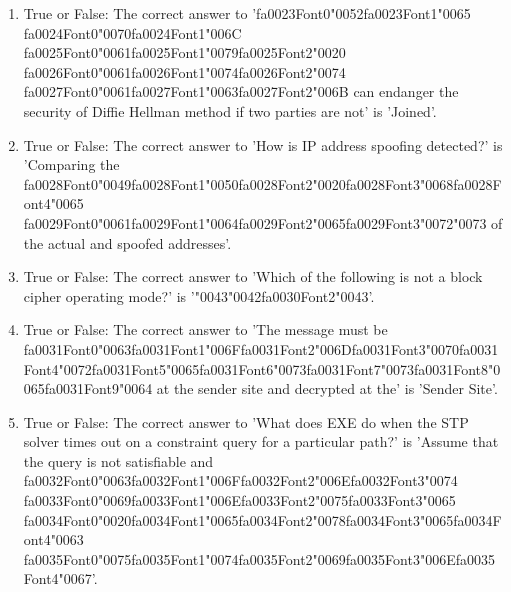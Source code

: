 \documentclass[12pt]{article}
\begin{document}
\begin{enumerate}[label=\arabic*.]
\item True or False: The correct answer to '{\csname fa0023Font0\endcsname\char"0052}{\csname fa0023Font1\endcsname\char"0065} {\csname fa0024Font0\endcsname\char"0070}{\csname fa0024Font1\endcsname\char"006C} {\csname fa0025Font0\endcsname\char"0061}{\csname fa0025Font1\endcsname\char"0079}{\csname fa0025Font2\endcsname\char"0020} {\csname fa0026Font0\endcsname\char"0061}{\csname fa0026Font1\endcsname\char"0074}{\csname fa0026Font2\endcsname\char"0074} {\csname fa0027Font0\endcsname\char"0061}{\csname fa0027Font1\endcsname\char"0063}{\csname fa0027Font2\endcsname\char"006B} can endanger the security of Diffie Hellman method if two parties are not' is 'Joined'.
\item True or False: The correct answer to 'How is IP address spoofing detected?' is 'Comparing the {\csname fa0028Font0\endcsname\char"0049}{\csname fa0028Font1\endcsname\char"0050}{\csname fa0028Font2\endcsname\char"0020}{\csname fa0028Font3\endcsname\char"0068}{\csname fa0028Font4\endcsname\char"0065} {\csname fa0029Font0\endcsname\char"0061}{\csname fa0029Font1\endcsname\char"0064}{\csname fa0029Font2\endcsname\char"0065}{\csname fa0029Font3\endcsname\char"0072}{\char"0073} of the actual and spoofed addresses'.
\item True or False: The correct answer to 'Which of the following is not a block cipher operating mode?' is '{\char"0043}{\char"0042}{\csname fa0030Font2\endcsname\char"0043}'.
\item True or False: The correct answer to 'The message must be {\csname fa0031Font0\endcsname\char"0063}{\csname fa0031Font1\endcsname\char"006F}{\csname fa0031Font2\endcsname\char"006D}{\csname fa0031Font3\endcsname\char"0070}{\csname fa0031Font4\endcsname\char"0072}{\csname fa0031Font5\endcsname\char"0065}{\csname fa0031Font6\endcsname\char"0073}{\csname fa0031Font7\endcsname\char"0073}{\csname fa0031Font8\endcsname\char"0065}{\csname fa0031Font9\endcsname\char"0064} at the sender site and decrypted at the' is 'Sender Site'.
\item True or False: The correct answer to 'What does EXE do when the STP solver times out on a constraint query for a particular path?' is 'Assume that the query is not satisfiable and {\csname fa0032Font0\endcsname\char"0063}{\csname fa0032Font1\endcsname\char"006F}{\csname fa0032Font2\endcsname\char"006E}{\csname fa0032Font3\endcsname\char"0074} {\csname fa0033Font0\endcsname\char"0069}{\csname fa0033Font1\endcsname\char"006E}{\csname fa0033Font2\endcsname\char"0075}{\csname fa0033Font3\endcsname\char"0065} {\csname fa0034Font0\endcsname\char"0020}{\csname fa0034Font1\endcsname\char"0065}{\csname fa0034Font2\endcsname\char"0078}{\csname fa0034Font3\endcsname\char"0065}{\csname fa0034Font4\endcsname\char"0063} {\csname fa0035Font0\endcsname\char"0075}{\csname fa0035Font1\endcsname\char"0074}{\csname fa0035Font2\endcsname\char"0069}{\csname fa0035Font3\endcsname\char"006E}{\csname fa0035Font4\endcsname\char"0067}'.
\end{enumerate}
\end{document}
